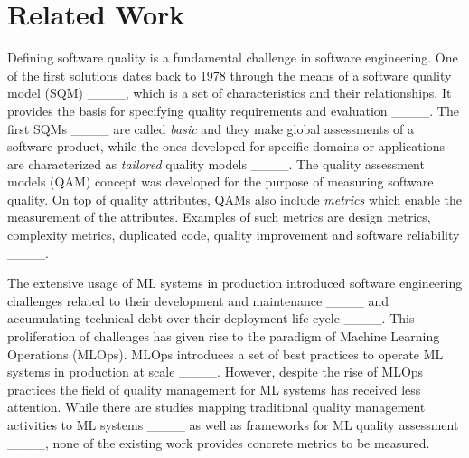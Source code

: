 \section{Related Work}
Defining software quality is a fundamental challenge in software engineering. One of the first solutions dates back to 1978 through the means of a software quality model (SQM) ____, which is a set of characteristics and their relationships. It provides the basis for specifying quality requirements and evaluation ____. The first SQMs ____ are called \textit{basic} and they make global assessments of a software product, while the ones developed for specific domains or applications are characterized as \textit{tailored} quality models ____.
The quality assessment models (QAM) concept was developed for the purpose of measuring software quality. On top of quality attributes, QAMs also include \textit{metrics} which enable the measurement of the attributes. Examples of such metrics are design metrics, complexity metrics, duplicated code, quality improvement and software reliability ____. %

The extensive usage of ML systems in production introduced software engineering challenges related to their development and maintenance ____ and accumulating technical debt over their deployment life-cycle ____. This proliferation of challenges has given rise to the paradigm of Machine Learning Operations (MLOps). 
MLOps introduces a set of best practices to operate ML systems in production at scale ____. However, despite the rise of MLOps practices the field of quality management for ML systems has received less attention. While there are studies mapping traditional quality management activities to ML systems ____ as well as frameworks for ML quality assessment ____, none of the existing work provides concrete metrics to be measured.


